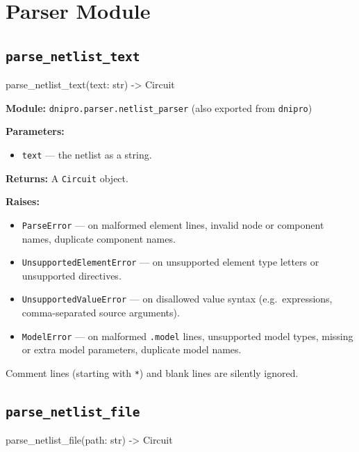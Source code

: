 \documentclass[11pt,a4paper]{article}
\newcommand{\code}[1]{\texttt{#1}}
\newenvironment{apisig}{%
  \begin{trivlist}\item\relax\ttfamily\small
}{%
  \end{trivlist}
}
\begin{document}
\section{Parser Module}
\label{sec:api-parser}

\subsection{\texttt{parse\_netlist\_text}}
\label{api:parse_netlist_text}

\begin{apisig}
parse\_netlist\_text(text: str) -> Circuit
\end{apisig}

\textbf{Module:} \code{dnipro.parser.netlist\_parser} (also exported from \code{dnipro})

\textbf{Parameters:}
\begin{itemize}[noitemsep]
    \item \code{text} --- the netlist as a string.
\end{itemize}

\textbf{Returns:} A \code{Circuit} object.

\textbf{Raises:}
\begin{itemize}[noitemsep]
    \item \code{ParseError} --- on malformed element lines, invalid node or component names,
          duplicate component names.
    \item \code{UnsupportedElementError} --- on unsupported element type letters or
          unsupported directives.
    \item \code{UnsupportedValueError} --- on disallowed value syntax (e.g.\ expressions,
          comma-separated source arguments).
    \item \code{ModelError} --- on malformed \code{.model} lines, unsupported model types,
          missing or extra model parameters, duplicate model names.
\end{itemize}

Comment lines (starting with \code{*}) and blank lines are silently ignored.

\subsection{\texttt{parse\_netlist\_file}}
\label{api:parse_netlist_file}

\begin{apisig}
parse\_netlist\_file(path: str) -> Circuit
\end{apisig}
\end{document}
